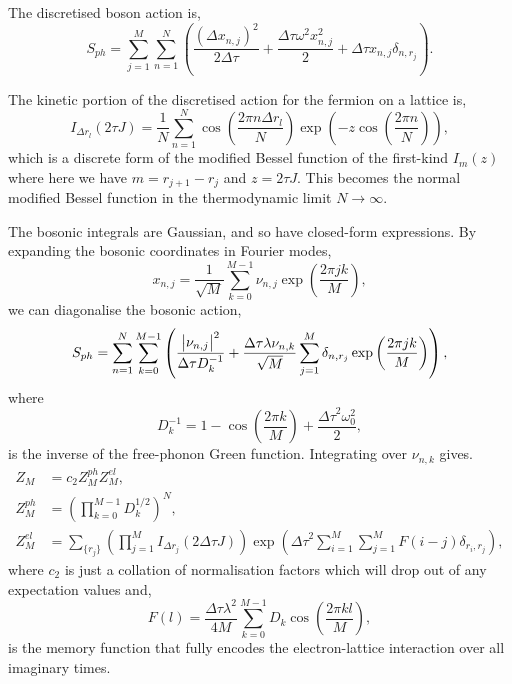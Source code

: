 The discretised boson action is,
\begin{equation}
    S_{ph} = \sum_{j=1}^M \sum_{n=1}^N \left( \frac{\left( \Delta x_{n,j} \right)^2}{2 \Delta\tau} + \frac{\Delta\tau \omega^2 x^2_{n,j}}{2} + \Delta\tau x_{n,j} \delta_{n,r_j}\right) .
\end{equation}

The kinetic portion of the discretised action for the fermion on a lattice is,
\begin{equation}
    I_{\Delta r_l}(2 \tau J) = \frac{1}{N} \sum_{n=1}^N \cos\left( \frac{2\pi n \Delta r_l}{N}  \right) \exp\left(-z \cos\left(\frac{2\pi n}{N}\right)\right) ,
\end{equation}
which is a discrete form of the modified Bessel function of the first-kind $I_m(z)$ \cite[\href{http://dlmf.nist.gov/10.32.E3}{(10.32.3)}]{NIST:DLMF} where here we have $m = r_{j+1} - r_j$ and $z = 2 \tau J$. This becomes the normal modified Bessel function in the thermodynamic limit $N \to \infty$.

The bosonic integrals are Gaussian, and so have closed-form expressions. By expanding the bosonic coordinates in Fourier modes,
\begin{equation}
    x_{n,j} = \frac{1}{\sqrt{M}} \sum_{k=0}^{M-1} \nu_{n,j} \exp\left( \frac{2\pi j k}{M} \right) ,
\end{equation}
we can diagonalise the bosonic action,
\begin{equation}
    S_{ph} = \sum_{n=1}^N \sum_{k=0}^{M-1} \left( \frac{\abs{\nu_{n,j}}^2}{\Delta\tau D_k^{-1}} + \frac{\Delta\tau \lambda \nu_{n,k}}{\sqrt{M}} \sum_{j=1}^M \delta_{n,r_j} \exp\left(\frac{2\pi j k}{M}\right) \right) ,
\end{equation}
where 
\begin{equation}
    D_k^{-1} = 1 - \cos\left(\frac{2\pi k}{M} \right) + \frac{{\Delta\tau}^2 \omega_0^2}{2} ,
\end{equation}
is the inverse of the free-phonon Green function. Integrating over $\nu_{n,k}$ gives.
\begin{equation}
    \begin{aligned}
        Z_M &= c_2 Z^{ph}_M Z_M^{el} , \\
        Z^{ph}_M &= \left( \prod_{k=0}^{M-1} D^{1/2}_k \right)^N , \\
        Z^{el}_M &= \sum_{\{r_j\}} \left( \prod_{j=1}^M I_{\Delta r_j}(2 \Delta\tau J) \right) \exp \left( {\Delta\tau}^2 \sum_{i=1}^M \sum_{j=1}^M F(i - j) \delta_{r_i, r_j} \right) ,
    \end{aligned}
\end{equation}
where $c_2$ is just a collation of normalisation factors which will drop out of any expectation values and,
\begin{equation}
    F(l) = \frac{\Delta\tau \lambda^2}{4M} \sum_{k=0}^{M-1} D_k \cos\left(\frac{2\pi k l }{M}\right) ,
\end{equation}
is the memory function that fully encodes the electron-lattice interaction over all imaginary times.

